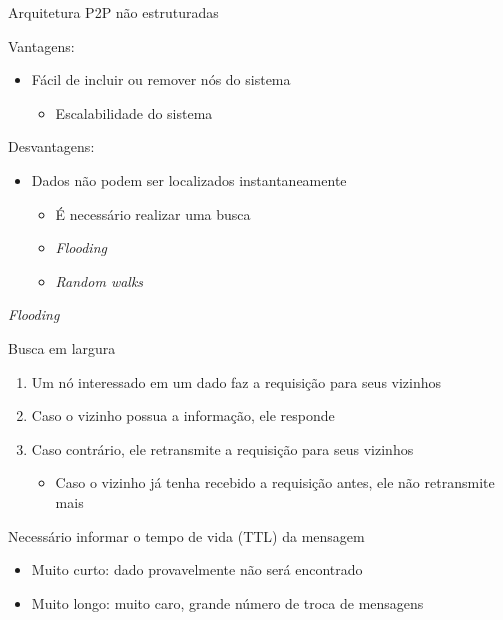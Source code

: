 \documentclass[compress]{beamer}
\begin{document}

\begin{frame}{Arquitetura P2P não estruturadas}

Vantagens:
\begin{itemize}
    \item Fácil de incluir ou remover nós do sistema
    \begin{itemize}
        \item Escalabilidade do sistema
    \end{itemize}
\end{itemize}

\vspace{0.5cm}

Desvantagens:
\begin{itemize}
    \item Dados não podem ser localizados instantaneamente
    \begin{itemize}
        \item É necessário realizar uma busca
        \item \textit{Flooding}
        \item \textit{Random walks}
    \end{itemize}
\end{itemize}
\end{frame}


\begin{frame}{\textit{Flooding}}

Busca em largura

\begin{enumerate}
    \item Um nó interessado em um dado faz a requisição para seus vizinhos
    \item Caso o vizinho possua a informação, ele responde
    \item Caso contrário, ele retransmite a requisição para seus vizinhos
    \begin{itemize}
        \item Caso o vizinho já tenha recebido a requisição antes, ele não retransmite mais
    \end{itemize}
\end{enumerate}

Necessário informar o tempo de vida (TTL) da mensagem
\begin{itemize}
    \item Muito curto: dado provavelmente não será encontrado
    \item Muito longo: muito caro, grande número de troca de mensagens
\end{itemize}
\end{frame}
\end{document}
